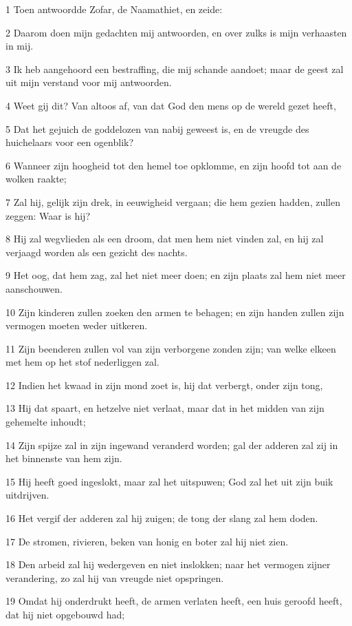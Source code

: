 \par 1 Toen antwoordde Zofar, de Naamathiet, en zeide:
\par 2 Daarom doen mijn gedachten mij antwoorden, en over zulks is mijn verhaasten in mij.
\par 3 Ik heb aangehoord een bestraffing, die mij schande aandoet; maar de geest zal uit mijn verstand voor mij antwoorden.
\par 4 Weet gij dit? Van altoos af, van dat God den mens op de wereld gezet heeft,
\par 5 Dat het gejuich de goddelozen van nabij geweest is, en de vreugde des huichelaars voor een ogenblik?
\par 6 Wanneer zijn hoogheid tot den hemel toe opklomme, en zijn hoofd tot aan de wolken raakte;
\par 7 Zal hij, gelijk zijn drek, in eeuwigheid vergaan; die hem gezien hadden, zullen zeggen: Waar is hij?
\par 8 Hij zal wegvlieden als een droom, dat men hem niet vinden zal, en hij zal verjaagd worden als een gezicht des nachts.
\par 9 Het oog, dat hem zag, zal het niet meer doen; en zijn plaats zal hem niet meer aanschouwen.
\par 10 Zijn kinderen zullen zoeken den armen te behagen; en zijn handen zullen zijn vermogen moeten weder uitkeren.
\par 11 Zijn beenderen zullen vol van zijn verborgene zonden zijn; van welke elkeen met hem op het stof nederliggen zal.
\par 12 Indien het kwaad in zijn mond zoet is, hij dat verbergt, onder zijn tong,
\par 13 Hij dat spaart, en hetzelve niet verlaat, maar dat in het midden van zijn gehemelte inhoudt;
\par 14 Zijn spijze zal in zijn ingewand veranderd worden; gal der adderen zal zij in het binnenste van hem zijn.
\par 15 Hij heeft goed ingeslokt, maar zal het uitspuwen; God zal het uit zijn buik uitdrijven.
\par 16 Het vergif der adderen zal hij zuigen; de tong der slang zal hem doden.
\par 17 De stromen, rivieren, beken van honig en boter zal hij niet zien.
\par 18 Den arbeid zal hij wedergeven en niet inslokken; naar het vermogen zijner verandering, zo zal hij van vreugde niet opspringen.
\par 19 Omdat hij onderdrukt heeft, de armen verlaten heeft, een huis geroofd heeft, dat hij niet opgebouwd had;
